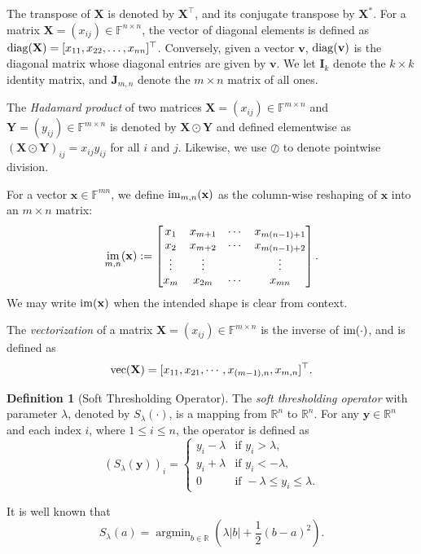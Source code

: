 \documentclass[10pt]{article}  	%
\theoremstyle{definition}
\newtheorem{definition}[theorem]{Definition}
\theoremstyle{definition}
\DeclareMathOperator*{\argmin}{argmin}
\newcommand{\R}{{\mathbb{R}}}
\newcommand{\F}{{\mathbb{F}}}
\newcommand{\diag}{{\rm{diag}}}
\DeclareMathOperator*{\vecc}{{\rm{vec}}}
\DeclareMathOperator*{\im}{{\rm{im}}}
\newcommand{\vv}{\mathbf{v}}
\newcommand{\vx}{\mathbf{x}}
\newcommand{\vy}{\mathbf{y}}
\newcommand{\mI}{\mathbf{I}}
\newcommand{\mJ}{\mathbf{J}}
\newcommand{\mX}{\mathbf{X}}
\newcommand{\mY}{\mathbf{Y}}
\theoremstyle{remark}
\begin{document}
The transpose of $\mX$ is denoted by $\mX^\top$, and its conjugate transpose by $\mX^*$. For a matrix $\mX = (x_{ij}) \in \mathbb{F}^{n \times n}$, the vector of diagonal elements is defined as $\diag(\mX) = [x_{11}, x_{22}, \ldots, x_{nn}]^\top$. Conversely, given a vector $\vv$, $\diag(\vv)$ is the diagonal matrix whose diagonal entries are given by $\vv$. We let $\mI_k$ denote the $k \times k$ identity matrix, and $\mJ_{m,n}$ denote the $m \times n$ matrix of all ones.


The \emph{Hadamard product} of two matrices $\mX = (x_{ij}) \in \mathbb{F}^{m \times n}$ and $\mY = (y_{ij}) \in \mathbb{F}^{m \times n}$ is denoted by $\mX \odot \mY$ and defined elementwise as $(\mX \odot \mY)_{ij} = x_{ij} y_{ij}$ for all $i$ and $j$. Likewise, we use $\oslash$ to denote pointwise division.

For a vector $\vx \in \mathbb{F}^{mn}$, we define $\im_{m,n}(\vx)$ as the column-wise reshaping of $\vx$ into an $m \times n$ matrix:
\[
\im_{m,n}(\vx) := \begin{bmatrix} x_1 & x_{m+1} & \cdots & x_{m(n-1)+1} \\ x_2 & x_{m+2} & \cdots & x_{m(n-1)+2} \\ \vdots & \vdots & & \vdots \\ x_m & x_{2m} & \cdots & x_{mn} \end{bmatrix}.
\]
We may write $\im(\vx)$ when the intended shape is clear from context.

The \emph{vectorization} of a matrix $\mX = (x_{ij}) \in \F^{m \times n}$ is the inverse of $\im(\cdot)$, and is defined as $$\vecc(\mX) = [x_{11}, x_{21}, \cdots, x_{(m-1), n}, x_{m,n}]^\top.$$

\begin{definition}[Soft Thresholding Operator] \label{def:3.2}
\normalfont
The \emph{soft thresholding operator} with parameter $\lambda$, denoted by $S_{\lambda}(\cdot)$, is a mapping from $\R^n$ to $\R^n$. For any $\vy \in \R^n$ and each index $i$, where $1 \leq i \leq n$, the operator is defined as
\[
(S_{\lambda}(\vy))_i = 
\begin{cases} 
      y_i - \lambda & \text{if } y_i >  \lambda, \\
      y_i + \lambda & \text{if } y_i < -\lambda, \\
      0 & \text{if } -\lambda \leq y_i \leq \lambda.
\end{cases}
\]
\end{definition}


It is well known that
\begin{equation}\label{equ:st}
S_\lambda(a)=\argmin_{b\in\R}\left(\lambda|b|+\frac{1}{2}(b-a)^2\right).
\end{equation}
\end{document}
